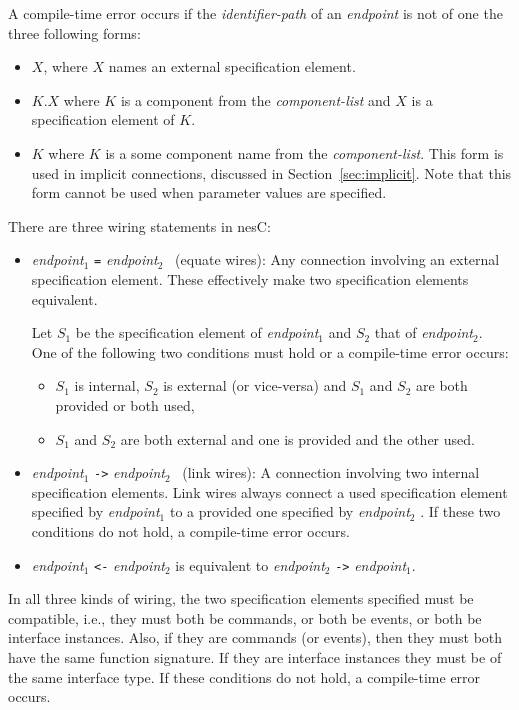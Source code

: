 \documentclass[11pt,letterpaper]{article}
\newcommand{\code}[1]{{\tt #1}}
\newcommand{\nesc}{nesC\xspace}
\begin{document}
A compile-time error occurs if the \emph{identifier-path} of an
\emph{endpoint} is not of one the three following forms:
\begin{itemize}
\item $X$, where $X$ names an external specification element.
\item $K.X$ where $K$ is a component from the \emph{component-list} and
$X$ is a specification element of $K$.
\item $K$ where $K$ is a some component name from the \emph{component-list}.
This form is used in implicit connections, discussed in
Section~\ref{sec:implicit}. Note that this form cannot be used when
parameter values are specified.
\end{itemize}

There are three wiring statements in \nesc:
\begin{itemize}
\item \emph{endpoint}$_1$ \code{=} \emph{endpoint}$_2$ \ (equate wires):
Any connection involving an external specification element. These
effectively make two specification elements equivalent.

Let $S_1$ be the specification element of \emph{endpoint}$_1$ and $S_2$
that of \emph{endpoint}$_2$. One of the following two conditions must hold
or a compile-time error occurs:
\begin{itemize}
\item $S_1$ is internal, $S_2$ is external (or vice-versa) and $S_1$ and
$S_2$ are both provided or both used,
\item $S_1$ and $S_2$ are both external and one is provided and the other used.
\end{itemize}

\item \emph{endpoint}$_1$ \code{->} \emph{endpoint}$_2$ \ (link wires): A
connection involving two internal specification elements. Link wires always
connect a used specification element specified by \emph{endpoint}$_1$ to a
provided one specified by \emph{endpoint}$_2$ . If these two conditions do
not hold, a compile-time error occurs.

\item \emph{endpoint}$_1$ \code{<-} \emph{endpoint}$_2$ is equivalent to
\emph{endpoint}$_2$ \code{->} \emph{endpoint}$_1$.
\end{itemize}

In all three kinds of wiring, the two specification elements specified must
be compatible, i.e., they must both be commands, or both be events, or both
be interface instances. Also, if they are commands (or events), then they
must both have the same function signature. If they are interface instances
they must be of the same interface type. If these conditions do not hold,
a compile-time error occurs.
\end{document}
